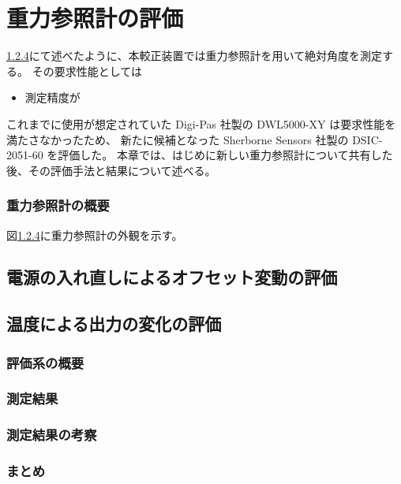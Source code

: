 \documentclass[../../main.tex]{subfiles}
\begin{document}
\chapter{重力参照計の評価}
\ref{}にて述べたように、本較正装置では重力参照計を用いて絶対角度を測定する。
その要求性能としては
\begin{itemize}
    \item 測定精度が
\end{itemize}
これまでに使用が想定されていた Digi-Pas 社製の DWL5000-XY は要求性能を満たさなかったため、
新たに候補となった Sherborne Sensors 社製の DSIC-2051-60 を評価した。
本章では、はじめに新しい重力参照計について共有した後、その評価手法と結果について述べる。
\subsection{重力参照計の概要}
図\ref{}に重力参照計の外観を示す。
\section{電源の入れ直しによるオフセット変動の評価}
\section{温度による出力の変化の評価}
\subsection{評価系の概要}
\subsection{測定結果}
\subsection{測定結果の考察}
\subsection{まとめ}
\end{document}
